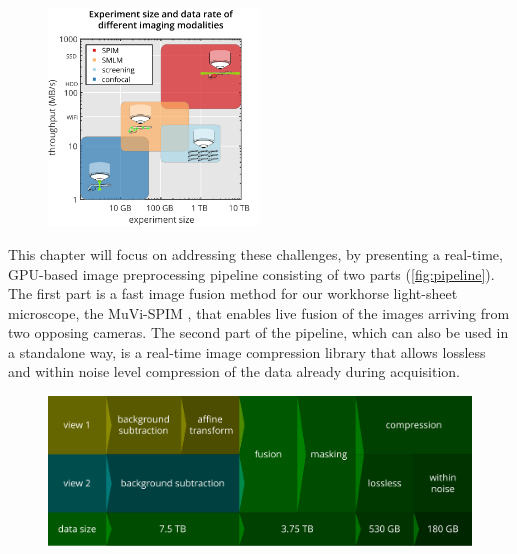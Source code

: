   \begin{figure}[btp]
    \centering
    \includegraphics[page=1,width=0.5\textwidth]{comparison_with_pictograms}
    \label{fig:sizes}
  \end{figure}


  This chapter will focus on addressing these challenges, by presenting a real-time, GPU-based image preprocessing pipeline consisting of two parts (\autoref{fig:pipeline}).
  The first part is a fast image fusion method for our workhorse light-sheet microscope, the MuVi-SPIM \cite{krzic_multiview_2012}, that enables live fusion of the images arriving from two opposing cameras.
  The second part of the pipeline, which can also be used in a standalone way, is a real-time image compression library that allows lossless and within noise level compression of the data already during acquisition.

  \begin{figure}
    \centering
    \includegraphics[width=\textwidth]{pipeline}
    \label{fig:pipeline}
  \end{figure}



